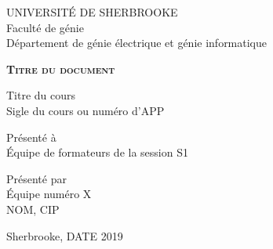 \begin{titlepage}
    \centering
    UNIVERSITÉ DE SHERBROOKE\\
    Faculté de génie\\
    Département de génie électrique et génie informatique

    \vfill

    {\LARGE \bfseries \scshape Titre du document}

    \vfill

    Titre du cours\\
    Sigle du cours ou numéro d’APP

    \vfill
    
    Présenté à\\
    Équipe de formateurs de la session S1

    \vfill

    Présenté par\\
    Équipe numéro X\\
    NOM, CIP

    \vfill

    Sherbrooke, DATE 2019
\end{titlepage}
